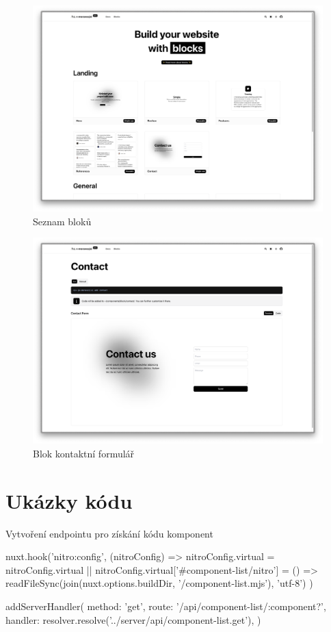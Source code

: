 \begin{figure}[h]
  \includegraphics[width=\textwidth]{images/blocks}
  \caption{Seznam bloků} \label{picture:documentation:blocks}
\end{figure}

\begin{figure}[h]
  \includegraphics[width=\textwidth]{images/block-contact-docs}
  \caption{Blok kontaktní formulář} \label{picture:documentation:block-contact-docs}
\end{figure}

\chapter{Ukázky kódu}

\begin{listing}[h]
  \caption{Vytvoření endpointu pro získání kódu komponent}
  \label{lst:link-to-endpoint}
  \begin{code}
nuxt.hook('nitro:config', (nitroConfig) => {
nitroConfig.virtual = nitroConfig.virtual || {}
  nitroConfig.virtual['#component-list/nitro'] = () =>
      readFileSync(join(nuxt.options.buildDir, '/component-list.mjs'), 'utf-8')
})

addServerHandler({
  method: 'get',
  route: '/api/component-list/:component?',
  handler: resolver.resolve('../server/api/component-list.get'),
})
\end{code}
\end{listing}

